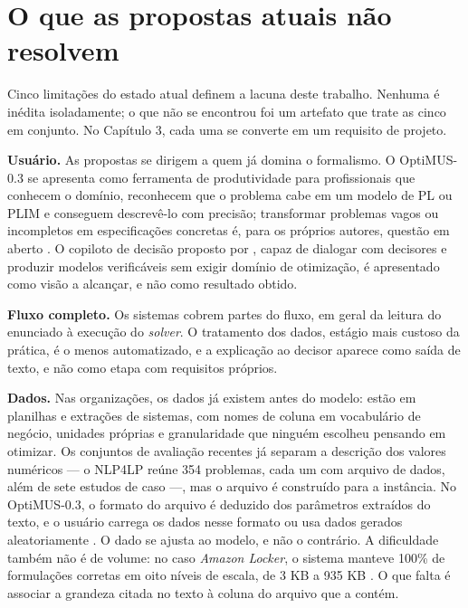 \section{O que as propostas atuais não resolvem}
\label{sec:lacunas}

Cinco limitações do estado atual definem a lacuna deste trabalho. Nenhuma é inédita isoladamente; o que não se encontrou foi um artefato que trate as cinco em conjunto. No Capítulo 3, cada uma se converte em um requisito de projeto.

\textbf{Usuário.} As propostas se dirigem a quem já domina o formalismo. O OptiMUS-0.3 se apresenta como ferramenta de produtividade para profissionais que conhecem o domínio, reconhecem que o problema cabe em um modelo de PL ou PLIM e conseguem descrevê-lo com precisão; transformar problemas vagos ou incompletos em especificações concretas é, para os próprios autores, questão em aberto \cite{ahmaditeshnizi2026}. O copiloto de decisão proposto por , capaz de dialogar com decisores e produzir modelos verificáveis sem exigir domínio de otimização, é apresentado como visão a alcançar, e não como resultado obtido.

\textbf{Fluxo completo.} Os sistemas cobrem partes do fluxo, em geral da leitura do enunciado à execução do \textit{solver}. O tratamento dos dados, estágio mais custoso da prática, é o menos automatizado, e a explicação ao decisor aparece como saída de texto, e não como etapa com requisitos próprios.

\textbf{Dados.} Nas organizações, os dados já existem antes do modelo: estão em planilhas e extrações de sistemas, com nomes de coluna em vocabulário de negócio, unidades próprias e granularidade que ninguém escolheu pensando em otimizar. Os conjuntos de avaliação recentes já separam a descrição dos valores numéricos --- o NLP4LP reúne 354 problemas, cada um com arquivo de dados, além de sete estudos de caso \cite[p.~7]{ahmaditeshnizi2026} ---, mas o arquivo é construído para a instância. No OptiMUS-0.3, o formato do arquivo é deduzido dos parâmetros extraídos do texto, e o usuário carrega os dados nesse formato ou usa dados gerados aleatoriamente \cite{ahmaditeshnizi2026}. O dado se ajusta ao modelo, e não o contrário. A dificuldade também não é de volume: no caso \textit{Amazon Locker}, o sistema manteve 100\% de formulações corretas em oito níveis de escala, de 3 KB a 935 KB \cite{ahmaditeshnizi2026}. O que falta é associar a grandeza citada no texto à coluna do arquivo que a contém.

